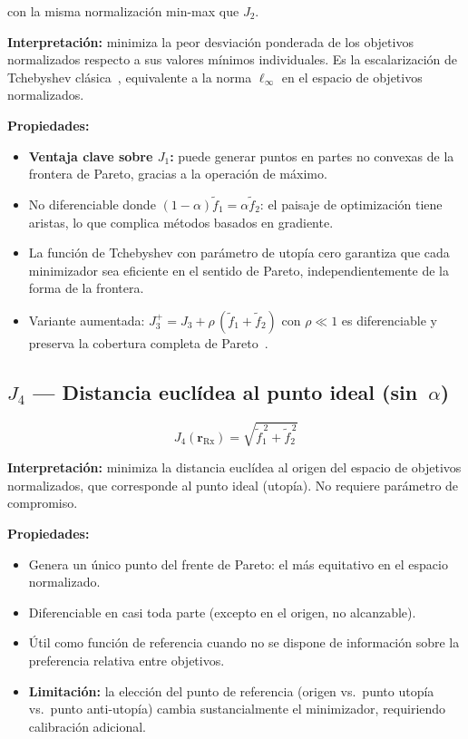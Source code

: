 \documentclass[11pt, a4paper]{article}
\newcommand{\Rx}{\mathrm{Rx}}
\newcommand{\rRx}{\mathbf{r}_{\Rx}}
\begin{document}
con la misma normalización min-max que $J_2$.

\textbf{Interpretación:} minimiza la peor desviación ponderada de los objetivos
normalizados respecto a sus valores mínimos individuales. Es la escalarización de
Tchebyshev clásica~\cite{messac2003}, equivalente a la norma $\ell_\infty$ en el
espacio de objetivos normalizados.

\textbf{Propiedades:}
\begin{itemize}
  \item \textbf{Ventaja clave sobre $J_1$:} puede generar puntos en partes no convexas
    de la frontera de Pareto, gracias a la operación de máximo.
  \item No diferenciable donde $(1-\alpha)\tilde{f}_1 = \alpha\tilde{f}_2$: el paisaje
    de optimización tiene aristas, lo que complica métodos basados en gradiente.
  \item La función de Tchebyshev con parámetro de utopía cero garantiza que cada
    minimizador sea eficiente en el sentido de Pareto, independientemente de la
    forma de la frontera.
  \item Variante aumentada: $J_3^{+} = J_3 + \rho\,(\tilde{f}_1 + \tilde{f}_2)$
    con $\rho \ll 1$ es diferenciable y preserva la cobertura completa de
    Pareto~\cite{messac2003}.
\end{itemize}

\subsection{\texorpdfstring{$J_4$}{J4} — Distancia euclídea al punto ideal (sin~$\alpha$)}

\begin{equation}
  J_4(\rRx) = \sqrt{\tilde{f}_1^{\,2} + \tilde{f}_2^{\,2}}
  \label{eq:J4}
\end{equation}

\textbf{Interpretación:} minimiza la distancia euclídea al origen del espacio de
objetivos normalizados, que corresponde al punto ideal (utopía). No requiere parámetro
de compromiso.

\textbf{Propiedades:}
\begin{itemize}
  \item Genera un único punto del frente de Pareto: el más equitativo en el espacio
    normalizado.
  \item Diferenciable en casi toda parte (excepto en el origen, no alcanzable).
  \item Útil como función de referencia cuando no se dispone de información sobre la
    preferencia relativa entre objetivos.
  \item \textbf{Limitación:} la elección del punto de referencia (origen vs.\ punto
    utopía vs.\ punto anti-utopía) cambia sustancialmente el minimizador, requiriendo
    calibración adicional.
\end{itemize}
\end{document}
